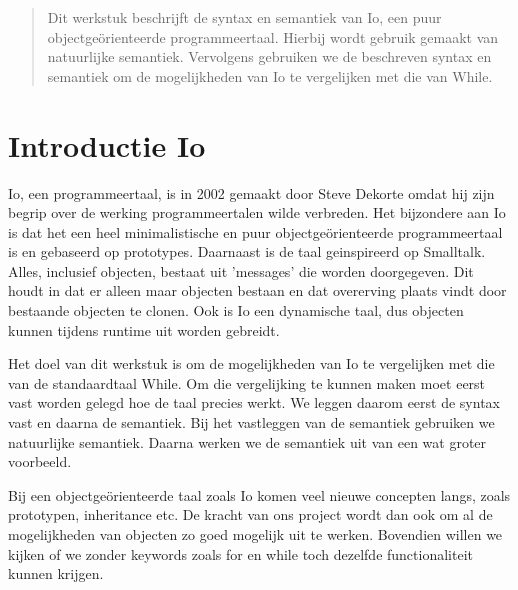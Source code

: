 \documentclass[12pt]{article}
\begin{document}
\maketitle

\begin{abstract}
Dit werkstuk beschrijft de syntax en semantiek van Io, een puur objectge\"orienteerde programmeertaal.
Hierbij wordt gebruik gemaakt van natuurlijke semantiek. Vervolgens gebruiken we de beschreven syntax en semantiek om
de mogelijkheden van Io te vergelijken met die van While.
\end{abstract}

\section{Introductie Io}
Io, een programmeertaal, is in 2002 gemaakt door Steve Dekorte omdat hij zijn begrip over de werking programmeertalen wilde verbreden.
Het bijzondere aan Io is dat het een heel minimalistische en puur objectge\"orienteerde programmeertaal is en gebaseerd op prototypes. Daarnaast is de taal geinspireerd op Smalltalk. Alles, inclusief objecten, bestaat uit 'messages' die worden doorgegeven.
Dit houdt in dat er alleen maar objecten bestaan en dat overerving plaats vindt door bestaande objecten te clonen.
Ook is Io een dynamische taal, dus objecten kunnen tijdens runtime uit worden gebreidt.

Het doel van dit werkstuk is om de mogelijkheden van Io te vergelijken met die van de standaardtaal While.
Om die vergelijking te kunnen maken moet eerst vast worden gelegd hoe de taal precies werkt.
We leggen daarom eerst de syntax vast en daarna de semantiek. Bij het vastleggen van de semantiek gebruiken we natuurlijke semantiek.
Daarna werken we de semantiek uit van een wat groter voorbeeld.

Bij een objectge\"orienteerde taal zoals Io komen veel nieuwe concepten langs, zoals prototypen, inheritance etc. De kracht van ons project wordt dan ook om al de mogelijkheden van objecten 
zo goed mogelijk uit te werken.  Bovendien willen we kijken of we zonder keywords zoals for en while toch dezelfde functionaliteit kunnen krijgen.
\end{document}
